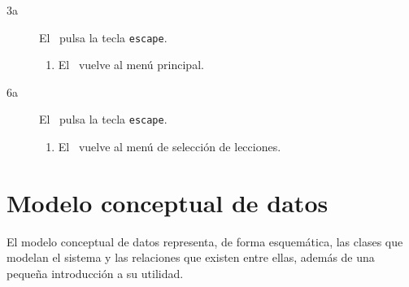 \begin{description}
\begin{description}
  \item[3a] El \jugador\ pulsa la tecla \texttt{escape}.
    \begin{enumerate}
    \item El \sistema\ vuelve al menú principal.
    \end{enumerate}

  \item[6a] El \jugador\ pulsa la tecla \texttt{escape}.
    \begin{enumerate}
    \item El \sistema\ vuelve al menú de selección de lecciones.
    \end{enumerate}

  \end{description}  
\end{description}

\section{Modelo conceptual de datos}

El modelo conceptual de datos representa, de forma esquemática, las clases que
modelan el sistema y las relaciones que existen entre ellas, además de una
pequeña introducción a su utilidad. 
